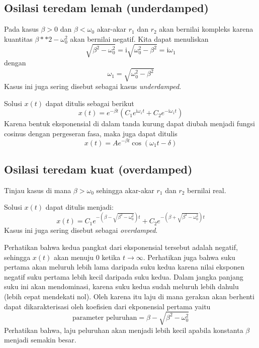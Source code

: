 \subsection*{Osilasi teredam lemah (underdamped)}

Pada kasus $\beta > 0$ dan $\beta < \omega_{0}$ akar-akar $r_{1}$ dan $r_{2}$ akan
bernilai kompleks karena kuantitas $\beta**2 - \omega_0^2$ akan bernilai negatif.
Kita dapat menuliskan
\begin{equation*}
\sqrt{\beta^{2}  -\omega_{0}^{2}} = \mathrm{i} \sqrt{\omega_{0}^{2}-\beta^{2}} = \mathrm{i}\omega_{1}
\end{equation*}
dengan 
\begin{equation*}
\omega_{1} = \sqrt{\omega_{0}^{2} - \beta^{2}}
\end{equation*}
Kasus ini juga sering disebut sebagai kasus \textit{underdamped}.

Solusi $x(t)$ dapat ditulis sebagai berikut
\begin{equation}
x(t) = e^{-\beta t} \left( C_{1}e^{\mathrm{i}\omega_{1}t} + C_{2}e^{-\mathrm{i}\omega_{1}t} \right)
\end{equation}
Karena bentuk eksponensial di dalam tanda kurung dapat diubah menjadi fungsi cosinus
dengan pergeseran fasa, maka juga dapat ditulis
\begin{equation}
x(t) = Ae^{-\beta t}\cos(\omega_{1}t - \delta)
\end{equation}


\subsection*{Osilasi teredam kuat (overdamped)}

Tinjau kasus di mana $\beta > \omega_{0}$ sehingga akar-akar $r_{1}$ dan $r_{2}$ bernilai real.

Solusi $x(t)$ dapat ditulis menjadi:
\begin{equation}
x(t) = C_{1}e^{ - \left( \beta - \sqrt{\beta^{2}-\omega_{0}^{2}} \right) t} +
       C_{2}e^{ - \left( \beta + \sqrt{\beta^{2}-\omega_{0}^{2}} \right) t}
\end{equation}
Kasus ini juga sering disebut sebagai \textit{overdamped}.
     
Perhatikan bahwa kedua pangkat dari eksponensial tersebut adalah negatif, sehingga $x(t)$ akan menuju 0 ketika
$t \rightarrow \infty$.
Perhatikan juga bahwa suku pertama akan meluruh lebih lama daripada suku kedua karena nilai
eksponen negatif suku pertama lebih kecil daripada suku
kedua. Dalam jangka panjang suku ini akan mendominasi, karena suku kedua sudah meluruh lebih dahulu (lebih cepat
mendekati nol). Oleh karena itu laju di mana gerakan akan berhenti dapat dikarakterisasi oleh
koefisien dari ekponensial pertama yaitu
\begin{equation}
\text{parameter peluruhan} = \beta - \sqrt{\beta^2 - \omega_0^2}
\end{equation}
Perhatikan bahwa, laju peluruhan akan menjadi lebih kecil apabila konstanta $\beta$
menjadi semakin besar.


